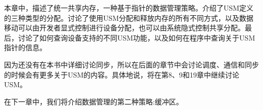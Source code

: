 本章中，描述了统一共享内存，一种基于指针的数据管理策略。介绍了USM定义的三种类型的分配。讨论了使用USM分配和释放内存的所有不同方式，以及数据移动可以由开发者显式控制进行设备分配，也可以由系统隐式控制共享分配。最后，讨论了如何查询设备支持的不同USM功能，以及如何在程序中查询关于USM指针的信息。\par

因为还没有在本书中详细讨论同步，所以在后面的章节中会讨论调度、通信和同步的时候会有更多关于USM的内容。具体地说，将在第8、9和19章中继续讨论USM。\par

在下一章中，我们将介绍数据管理的第二种策略:缓冲区。\par

\newpage